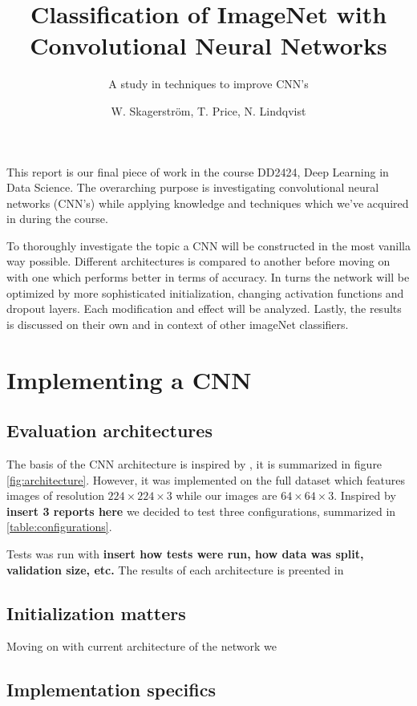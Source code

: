 \documentclass{kthreport}
\title{Classification of ImageNet with Convolutional Neural Networks}
\subtitle{A study in techniques to improve CNN's}
\author{W. Skagerström, T. Price, N. Lindqvist}
\begin{document}
\maketitle


This report is our final piece of work in the course DD2424, Deep Learning in Data Science. The overarching purpose is investigating convolutional neural networks (CNN's) while applying knowledge and techniques which we've acquired in during the course.

To thoroughly investigate the topic a CNN will be constructed in the most vanilla way possible. Different architectures is compared to another before moving on with one which performs better in terms of accuracy. In turns the network will be optimized by more sophisticated initialization, changing activation functions and dropout layers. Each modification and effect will be analyzed. Lastly, the results is discussed on their own and in context of other imageNet classifiers.


\section{Implementing a CNN}

\subsection{Evaluation architectures}

The basis of the CNN architecture is inspired by \cite{NIPS2012_4824}, it is summarized in figure \ref{fig:architecture}. However, it was implemented on the full dataset which features images of resolution $224\times224\times3$ while our images are $64\times64\times3$. Inspired by \textbf{insert 3 reports here} we decided to test three configurations, summarized in \ref{table:configurations}.



Tests was run with \textbf{insert how tests were run, how data was split, validation size, etc.} The results of each architecture is preented in

\subsection{Initialization matters}

Moving on with current architecture of the network we 

\subsection{Implementation specifics}
\end{document}
